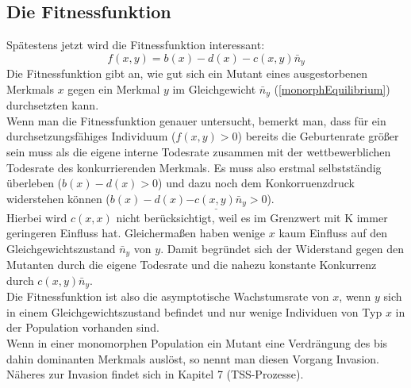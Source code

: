 \documentclass[11pt, a4paper, german]{article}
\theoremstyle{plain}
\begin{document}
	\subsection{Die Fitnessfunktion}
		Spätestens jetzt wird die Fitnessfunktion interessant:
		\[ f(x,y) = b(x) - d(x) - c(x,y)\bar{n}_y \]
		Die Fitnessfunktion gibt an, wie gut sich ein Mutant eines ausgestorbenen Merkmals $ x $ gegen ein Merkmal $ y $ im Gleichgewicht $ \bar{n}_y $ (\ref{monorphEquilibrium}) durchsetzten kann.\\
		Wenn man die Fitnessfunktion genauer untersucht, bemerkt man, dass für ein durchsetzungsfähiges Individuum ($ f(x,y) > 0 $) bereits die Geburtenrate größer sein muss als die eigene interne Todesrate zusammen mit der wettbewerblichen Todesrate des konkurrierenden Merkmals. Es muss also erstmal selbstständig überleben ($ b(x) - d(x) > 0 $) und dazu noch dem Konkorruenzdruck widerstehen können ($ b(x) - d(x) \underline{- c(x,y)\bar{n}_y} > 0 $).\\
		Hierbei wird $ c(x,x) $ nicht berücksichtigt, weil es im Grenzwert mit K immer geringeren Einfluss hat. Gleichermaßen haben wenige $ x $ kaum Einfluss auf den Gleichgewichtszustand $ \bar{n}_y $ von $ y $. Damit begründet sich der Widerstand gegen den Mutanten durch die eigene Todesrate und die nahezu konstante Konkurrenz durch $ c(x,y)\bar{n}_y $.\\
		Die Fitnessfunktion ist also die asymptotische Wachstumsrate von $ x $, wenn $ y $ sich in einem Gleichgewichtszustand befindet und nur wenige Individuen von Typ $ x $ in der Population vorhanden sind.\\
		Wenn in einer monomorphen Population ein Mutant eine Verdrängung des bis dahin dominanten Merkmals auslöst, so nennt man diesen Vorgang Invasion. Näheres zur Invasion findet sich in Kapitel 7 (TSS-Prozesse).
	
\end{document}
